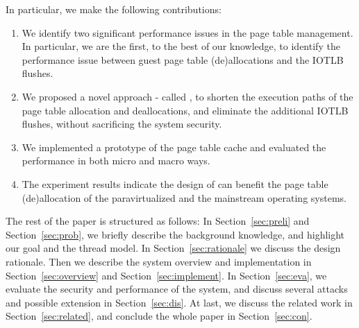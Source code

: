 In particular, we make the following contributions:
\begin{enumerate}
\item We identify two significant performance issues in the page table management. In particular, we are the first, to the best of our knowledge, to identify the performance issue between guest page table (de)allocations and the IOTLB flushes.
\item We proposed a novel approach - called \name, to shorten the execution paths of the page table allocation and deallocations, and eliminate the additional IOTLB flushes, without sacrificing the system security.
\item We implemented a prototype of the page table cache and evaluated the performance in both micro and macro ways.
\item The experiment results indicate the design of \name can benefit the page table (de)allocation of the paravirtualized and the mainstream operating systems.
\end{enumerate}

The rest of the paper is structured as follows: In Section~\ref{sec:preli} and Section~\ref{sec:prob}, we briefly describe the background knowledge, and highlight our goal and the thread model. In Section~\ref{sec:rationale} we discuss the design rationale. Then we describe the system overview and implementation in Section~\ref{sec:overview} and Section~\ref{sec:implement}. In Section~\ref{sec:eva}, we evaluate the security and performance of the system, and discuss several attacks and possible extension in Section~\ref{sec:dis}. At last, we discuss the related work in Section~\ref{sec:related}, and conclude the whole paper in Section~\ref{sec:con}.

